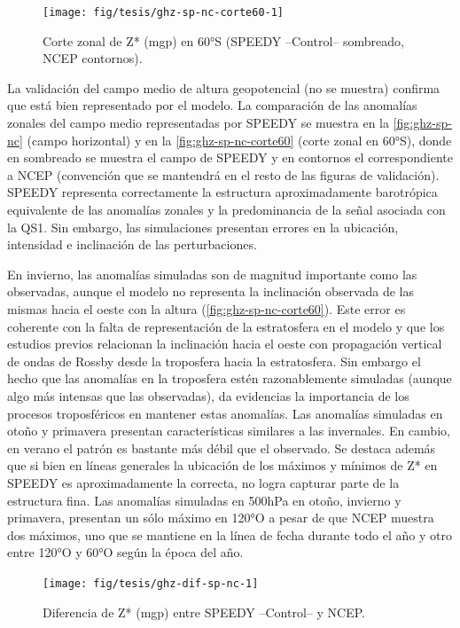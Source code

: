 \documentclass[spanish,a4paper,12pt,oneside]{book}
\begin{document}
\begin{figure}
\texttt{[image: fig/tesis/ghz-sp-nc-corte60-1]} \caption{Corte zonal de Z* (mgp) en 60°S (SPEEDY --Control-- sombreado, NCEP contornos).}\label{fig:ghz-sp-nc-corte60}
\end{figure}

La validación del campo medio de altura geopotencial (no se muestra)
confirma que está bien representado por el modelo. La comparación de las
anomalías zonales del campo medio representadas por SPEEDY se muestra en
la \autoref{fig:ghz-sp-nc} (campo horizontal) y en la
\autoref{fig:ghz-sp-nc-corte60} (corte zonal en 60°S), donde en
sombreado se muestra el campo de SPEEDY y en contornos el
correspondiente a NCEP (convención que se mantendrá en el resto de las
figuras de validación). SPEEDY representa correctamente la estructura
aproximadamente barotrópica equivalente de las anomalías zonales y la
predominancia de la señal asociada con la QS1. Sin embargo, las
simulaciones presentan errores en la ubicación, intensidad e inclinación
de las perturbaciones.

En invierno, las anomalías simuladas son de magnitud importante como las
observadas, aunque el modelo no representa la inclinación observada de
las mismas hacia el oeste con la altura
(\autoref{fig:ghz-sp-nc-corte60}). Este error es coherente con la falta
de representación de la estratosfera en el modelo y que los estudios
previos relacionan la inclinación hacia el oeste con propagación
vertical de ondas de Rossby desde la troposfera hacia la estratosfera.
Sin embargo el hecho que las anomalías en la troposfera estén
razonablemente simuladas (aunque algo más intensas que las observadas),
da evidencias la importancia de los procesos troposféricos en mantener
estas anomalías. Las anomalías simuladas en otoño y primavera presentan
características similares a las invernales. En cambio, en verano el
patrón es bastante más débil que el observado. Se destaca además que si
bien en líneas generales la ubicación de los máximos y mínimos de Z* en
SPEEDY es aproximadamente la correcta, no logra capturar parte de la
estructura fina. Las anomalías simuladas en 500hPa en otoño, invierno y
primavera, presentan un sólo máximo en 120°O a pesar de que NCEP muestra
dos máximos, uno que se mantiene en la línea de fecha durante todo el
año y otro entre 120°O y 60°O según la época del año.

\begin{landscape}\begin{figure}

{\centering \texttt{[image: fig/tesis/ghz-dif-sp-nc-1]} 

}

\caption{Diferencia de Z* (mgp) entre SPEEDY --Control-- y NCEP.}\label{fig:ghz-dif-sp-nc}
\end{figure}
\end{landscape}
\end{document}
